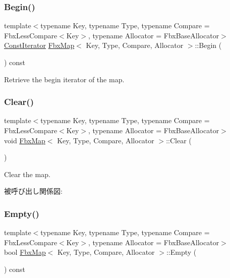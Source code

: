 \subsubsection{\texorpdfstring{Begin()}{Begin()}\hspace{0.1cm}{\footnotesize\ttfamily [2/2]}}
{\footnotesize\ttfamily template$<$typename Key, typename Type, typename Compare = Fbx\+Less\+Compare$<$\+Key$>$, typename Allocator = Fbx\+Base\+Allocator$>$ \\
\hyperlink{class_fbx_map_acf89f4bb5cf415e5e04087c2179bf367}{Const\+Iterator} \hyperlink{class_fbx_map}{Fbx\+Map}$<$ Key, Type, Compare, Allocator $>$\+::Begin (\begin{DoxyParamCaption}{ }\end{DoxyParamCaption}) const}



Retrieve the begin iterator of the map. 

\mbox{\label{class_fbx_map_a4d7bc86f85835f091d6623d6e358d2ca}} 
\subsubsection{\texorpdfstring{Clear()}{Clear()}}
{\footnotesize\ttfamily template$<$typename Key, typename Type, typename Compare = Fbx\+Less\+Compare$<$\+Key$>$, typename Allocator = Fbx\+Base\+Allocator$>$ \\
void \hyperlink{class_fbx_map}{Fbx\+Map}$<$ Key, Type, Compare, Allocator $>$\+::Clear (\begin{DoxyParamCaption}{ }\end{DoxyParamCaption})}



Clear the map. 

被呼び出し関係図\+:
\mbox{\label{class_fbx_map_a64fb934f6378b6d41b383bdcfa3b5b26}} 
\subsubsection{\texorpdfstring{Empty()}{Empty()}}
{\footnotesize\ttfamily template$<$typename Key, typename Type, typename Compare = Fbx\+Less\+Compare$<$\+Key$>$, typename Allocator = Fbx\+Base\+Allocator$>$ \\
bool \hyperlink{class_fbx_map}{Fbx\+Map}$<$ Key, Type, Compare, Allocator $>$\+::Empty (\begin{DoxyParamCaption}{ }\end{DoxyParamCaption}) const}




